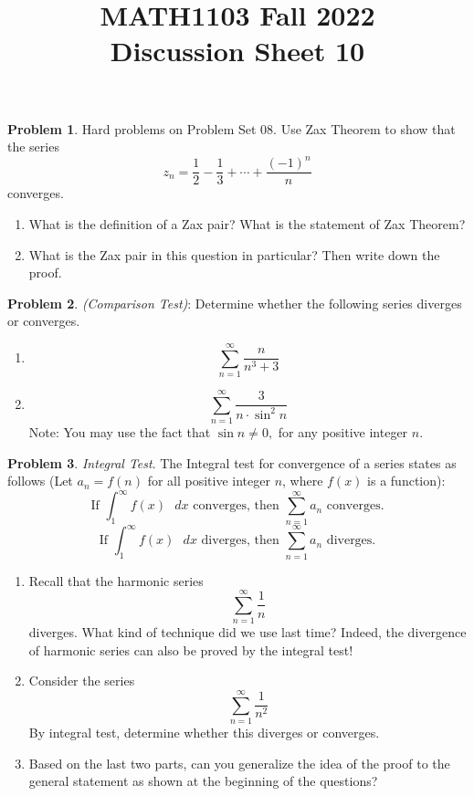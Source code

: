 \documentclass[11pt,oneside]{amsart}
\title{MATH1103 Fall 2022\\
Discussion Sheet 10}
\theoremstyle{definition}
\newtheorem{problem}{Problem}
\begin{document}
    \maketitle
 
    \begin{problem} Hard problems on Problem Set 08.
    \newline
    Use Zax Theorem to show that the series
    $$
    z_n=\frac{1}{2}-\frac{1}{3}+\cdots+\frac{(-1)^n}{n}
    $$
    converges.
    \begin{enumerate}
        \item What is the definition of a Zax pair? What is the statement of Zax Theorem?
        \vfill
        \item What is the Zax pair in this question in particular? Then write down the proof.
        \vfill
        \end{enumerate}
    \end{problem}
\newpage

    \begin{problem}
    \textit{(Comparison Test)}: Determine whether the following series diverges or converges.
    \begin{enumerate}
    \item 
    $$
    \sum_{n=1}^\infty \dfrac{n}{n^3+3}
    $$
    \vfill
    \item
    $$
    \sum_{n=1}^\infty \dfrac{3}{n\cdot {\sin}^2 n}
    $$
    Note: You may use the fact that $\sin n \not =0,$ for any positive integer $n$.
    \vfill
    \end{enumerate}
    \end{problem}
    \newpage
    \begin{problem}\textit{Integral Test}.
    The Integral test for convergence of a series states as follows (Let $a_n=f(n)$ for all positive integer $n$, where $f(x)$ is a function):
    $$
    \text{If }\int_1^\infty f(x) \text{ }dx \text{ converges, then }\sum_{n=1}^\infty a_n \text{ converges}.
    $$
    $$
    \text{If }\int_1^\infty f(x) \text{ }dx \text{ diverges, then }\sum_{n=1}^\infty a_n \text{ diverges}.
    $$
    \begin{enumerate}
        \item Recall that the harmonic series
        $$
        \sum_{n=1}^\infty \frac{1}{n}
        $$
        diverges. What kind of technique did we use last time? Indeed, the divergence of harmonic series can also be proved by the integral test!
        \vfill
        \item Consider the series
        $$
        \sum_{n=1}^\infty \frac{1}{n^2}
        $$
        By integral test, determine whether this diverges or converges.
        \vfill
        \item Based on the last two parts, can you generalize the idea of the proof to the general statement as shown at the beginning of the questions?
    \end{enumerate}
    \end{problem}
\end{document}
